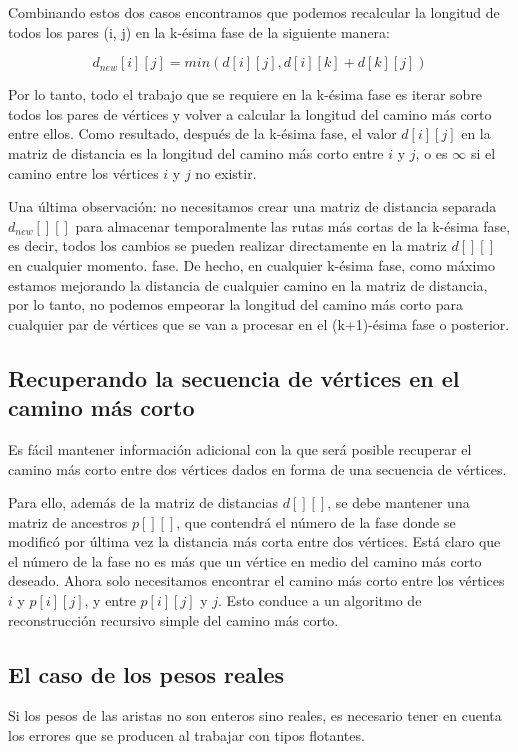 Combinando estos dos casos encontramos que podemos recalcular la longitud de todos los pares (i, j) en la k-ésima fase de la siguiente manera:

$$d_{new}[i][j] = min(d[i][j], d[i][k] + d[k][j])$$

Por lo tanto, todo el trabajo que se requiere en la k-ésima fase es iterar sobre todos los pares de vértices y volver a calcular la longitud del camino más corto entre ellos. Como resultado, después de la k-ésima fase, el valor $d[i][j]$ en la matriz de distancia es la longitud del camino más corto entre $i$ y $j$, o es $\infty$ si el camino entre los vértices $i$ y $j$ no existir.

Una última observación: no necesitamos crear una matriz de distancia separada $d_{new}[][]$ para almacenar temporalmente las rutas más cortas de la k-ésima fase, es decir, todos los cambios se pueden realizar directamente en la matriz $d[][]$ en cualquier momento. fase. De hecho, en cualquier k-ésima fase, como máximo estamos mejorando la distancia de cualquier camino en la matriz de distancia, por lo tanto, no podemos empeorar la longitud del camino más corto para cualquier par de vértices que se van a procesar en el (k+1)-ésima fase o posterior.

\subsection{Recuperando la secuencia de vértices en el camino más corto}

Es fácil mantener información adicional con la que será posible recuperar el camino más corto entre dos vértices dados en forma de una secuencia de vértices.

Para ello, además de la matriz de distancias $d[][]$, se debe mantener una matriz de ancestros $p[][]$, que contendrá el número de la fase donde se modificó por última vez la distancia más corta entre dos vértices. Está claro que el número de la fase no es más que un vértice en medio del camino más corto deseado. Ahora solo necesitamos encontrar el camino más corto entre los vértices $i$ y $p[i][j]$, y entre $p[i][j]$ y $j$. Esto conduce a un algoritmo de reconstrucción recursivo simple del camino más corto.

\subsection{El caso de los pesos reales}

Si los pesos de las aristas no son enteros sino reales, es necesario tener en cuenta los errores que se producen al trabajar con tipos flotantes.

